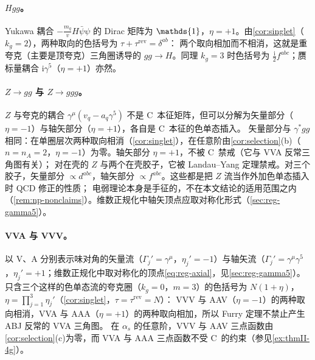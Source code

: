 \documentclass[UTF8,a4paper,11pt,fontset=fandol]{ctexart}
\let\amsmathbb\mathbb
\renewcommand{\mathbb}[1]{\ifx1#1\mathds{1}\else\amsmathbb{#1}\fi}
\theoremstyle{cplain}
\theoremstyle{cdefinition}
\theoremstyle{cremark}
\numberwithin{equation}{section}
\newcommand{\ii}{\mathrm{i}}                        %
\begin{document}
\paragraph{$Hgg$。}Yukawa 耦合 $-\frac{m_q}{v}H\bar\psi\psi$ 的 Dirac 矩阵为 $\mathbb 1$，$\eta=+1$。由\cref{cor:singlet}（$k_g=2$），两种取向的色括号为 $\tau+\tau^{\mathrm{rev}}=\delta^{ab}$：
两个取向相加而不相消，这就是重夸克（主要是顶夸克）三角圈诱导的 $gg\to H$。同理 $k_g=3$ 时色括号为 $\frac{\ii}{2}f^{abc}$；赝标量耦合 $\ii\gamma^5$（$\eta=+1$）亦然。

\paragraph{$Z\to gg$ 与 $Z\to ggg$。}$Z$ 与夸克的耦合 $\gamma^\mu(v_q-a_q\gamma^5)$ 不是 C~本征矩阵，但可以分解为矢量部分（$\eta=-1$）与轴矢部分（$\eta=+1$），各自是 C~本征的色单态插入。
矢量部分与 $\gamma^*gg$ 相同：在单圈层次两种取向相消（\cref{cor:singlet}），在任意阶由\cref{cor:selection}(b)（$n=n_A=2$，$\eta=-1$）为零。轴矢部分 $\eta=+1$，不被 C~禁戒（它与 VVA 反常三角图有关）；
对在壳的 $Z$ 与两个在壳胶子，它被 Landau--Yang 定理禁戒。对三个胶子，矢量部分 $\propto d^{abc}$，轴矢部分 $\propto f^{abc}$。这些都是把 $Z$ 流当作外加色单态插入时 QCD 修正的性质；
电弱理论本身是手征的，不在本文结论的适用范围之内（\cref{rem:np-nonclaims}）。维数正规化中轴矢顶点应取对称化形式（\cref{sec:reg-gamma5}）。

\paragraph{VVA 与 VVV。}以 V、A 分别表示味对角的矢量流（$\Gamma_j'=\gamma^\mu$，$\eta_j'=-1$）与轴矢流（$\Gamma_j'=\gamma^\mu\gamma^5$，$\eta_j'=+1$；维数正规化中取对称化的顶点\cref{eq:reg-axial}，见\cref{sec:reg-gamma5}）。
只含三个这样的色单态流的夸克圈（$k_g=0$，$m=3$）的色括号为 $N(1+\eta)$，$\eta=\prod_{j=1}^3\eta_j'$（\cref{cor:singlet}，$\tau=\tau^{\mathrm{rev}}=N$）：
VVV 与 AAV（$\eta=-1$）的两种取向相消，VVA 与 AAA（$\eta=+1$）的两种取向相加，所以 Furry 定理不禁止产生 ABJ 反常的 VVA 三角图。
在 $\alpha_s$ 的任意阶，VVV 与 AAV 三点函数由\cref{cor:selection}(c)为零，而 VVA 与 AAA 三点函数不受 C~的约束（参见\cref{ex:thmII-4g}）。
\end{document}
